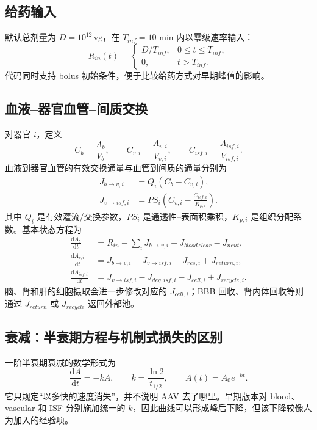 \documentclass[UTF8,11pt,a4paper]{ctexart}
\newcommand{\vg}{\mathrm{vg}}
\newcommand{\dd}{\mathrm{d}}
\begin{document}
\subsection{给药输入}
默认总剂量为 $D=10^{12}\,\vg$，在 $T_{inf}=10$ min 内以零级速率输入：
\begin{equation}
R_{in}(t)=
\begin{cases}
D/T_{inf}, & 0\le t\le T_{inf},\\
0, & t>T_{inf}.
\end{cases}
\end{equation}
代码同时支持 bolus 初始条件，便于比较给药方式对早期峰值的影响。

\subsection{血液--器官血管--间质交换}
对器官 $i$，定义
\begin{equation}
C_b=\frac{A_b}{V_b},\qquad C_{v,i}=\frac{A_{v,i}}{V_{v,i}},\qquad C_{isf,i}=\frac{A_{isf,i}}{V_{isf,i}}.
\end{equation}
血液到器官血管的有效交换通量与血管到间质的通量分别为
\begin{align}
J_{b\to v,i} &= Q_i(C_b-C_{v,i}),\\
J_{v\to isf,i} &= PS_i\left(C_{v,i}-\frac{C_{isf,i}}{K_{p,i}}\right).
\end{align}
其中 $Q_i$ 是有效灌流/交换参数，$PS_i$ 是通透性--表面积乘积，$K_{p,i}$ 是组织分配系数。基本状态方程为
\begin{align}
\frac{\dd A_b}{\dd t} &= R_{in}-\sum_iJ_{b\to v,i}-J_{blood\,clear}-J_{neut},\\
\frac{\dd A_{v,i}}{\dd t} &= J_{b\to v,i}-J_{v\to isf,i}-J_{res,i}+J_{return,i},\\
\frac{\dd A_{isf,i}}{\dd t} &= J_{v\to isf,i}-J_{deg,isf,i}-J_{cell,i}+J_{recycle,i}.
\end{align}
脑、肾和肝的细胞摄取会进一步修改对应的 $J_{cell,i}$；BBB 回收、肾内体回收等则通过 $J_{return}$ 或 $J_{recycle}$ 返回外部池。

\subsection{衰减：半衰期方程与机制式损失的区别}
一阶半衰期衰减的数学形式为
\begin{equation}
\frac{\dd A}{\dd t}=-kA,\qquad k=\frac{\ln2}{t_{1/2}},\qquad A(t)=A_0e^{-kt}.
\end{equation}
它只规定“以多快的速度消失”，并不说明 AAV 去了哪里。早期版本对 blood、vascular 和 ISF 分别施加统一的 $k$，因此曲线可以形成峰后下降，但该下降较像人为加入的经验项。
\end{document}

